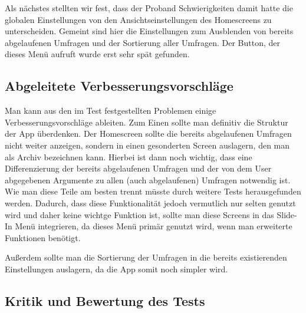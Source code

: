 Als nächstes stellten wir fest, dass der Proband Schwierigkeiten damit hatte die globalen Einstellungen von den Ansichtseinstellungen des Homescreens zu unterscheiden. Gemeint sind hier die Einstellungen zum Ausblenden von bereits abgelaufenen Umfragen und der Sortierung aller Umfragen. Der Button, der dieses Menü aufruft wurde erst sehr spät gefunden.


\subsection{Abgeleitete Verbesserungsvorschläge}
\label{sec:verbesserungsvorschlaege}

Man kann aus den im Test festgestellten Problemen einige Verbesserungsvorschläge ableiten. Zum Einen sollte man definitiv die Struktur der App überdenken. Der Homescreen sollte die bereits abgelaufenen Umfragen nicht weiter anzeigen, sondern in einen gesonderten Screen auslagern, den man als Archiv bezeichnen kann. Hierbei ist dann noch wichtig, dass eine Differenzierung der bereits abgelaufenen Umfragen und der von dem User abgegebenen Argumente zu allen (auch abgelaufenen) Umfragen notwendig ist. Wie man diese Teile am besten trennt müsste durch weitere Tests herausgefunden werden. Dadurch, dass diese Funktionalität jedoch vermutlich nur selten genutzt wird und daher keine wichtge Funktion ist, sollte man diese Screens in das Slide-In Menü integrieren, da dieses Menü primär genutzt wird, wenn man erweiterte Funktionen benötigt.

Außerdem sollte man die Sortierung der Umfragen in die bereits existierenden Einstellungen auslagern, da die App somit noch simpler wird.

\subsection{Kritik und Bewertung des Tests}
\label{sec:kritik}

